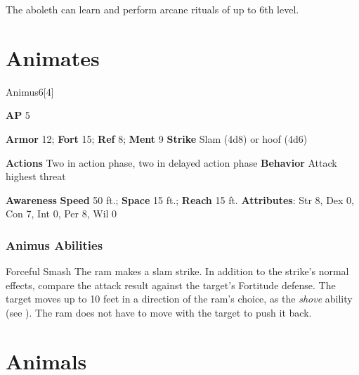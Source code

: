 The aboleth can learn and perform arcane rituals of up to 6th level.




\section{Animates}

\begin{monsection}[Ram]{Animus}{6}[4]
\vspace{-1em}\vspace{-1em}
\begin{spellcontent}
\begin{spelltargetinginfo}
{\textbf{AP} 5}

\pari \textbf{Armor} 12;
\textbf{Fort} 15;
\textbf{Ref} 8;
\textbf{Ment} 9
\pari \textbf{Strike} Slam  (4d8) or hoof  (4d6)


\pari \textbf{Actions} Two in action phase, two in delayed action phase
\pari \textbf{Behavior} Attack highest threat
\end{spelltargetinginfo}
\end{spellcontent}

\begin{monsterfooter}
\pari \textbf{Awareness} 
\pari \textbf{Speed} 50 ft.;
\textbf{Space} 15 ft.;
\textbf{Reach} 15 ft.
\pari \textbf{Attributes}:
Str 8,
Dex 0,
Con 7,
Int 0,
Per 8,
Wil 0
\end{monsterfooter}
\end{monsection}


\subsubsection{Animus Abilities}

\begin{ability}{Forceful Smash}
The ram makes a slam strike.
In addition to the strike's normal effects, compare the attack result against the target's Fortitude defense.
\hit The target moves up to 10 feet in a direction of the ram's choice, as the \textit{shove} ability (see ).
The ram does not have to move with the target to push it back.
\end{ability}





\section{Animals}

